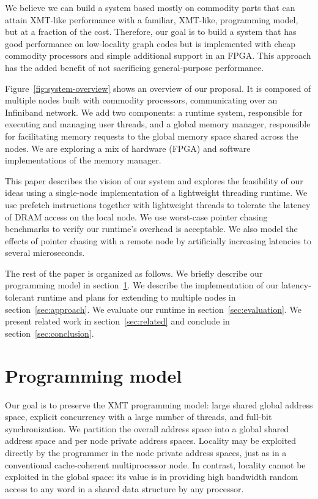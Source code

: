 \documentclass[10pt,nocopyrightspace]{sigplanconf}
\begin{document}
We believe we can build a system based mostly on commodity parts that
can attain XMT-like performance with a familiar, XMT-like,
programming model, but at a fraction of the cost. Therefore, our goal
is to build a system that has good performance on low-locality graph
codes but is implemented with cheap commodity processors and simple
additional support in an FPGA. This approach has the added
benefit of not sacrificing general-purpose performance.

Figure~\ref{fig:system-overview} shows an overview of our proposal. It
is composed of multiple nodes built with commodity processors,
communicating over an Infiniband network. We add two components: a
runtime system, responsible for executing and managing user threads,
and a global memory manager, responsible for facilitating memory
requests to the global memory space shared across the nodes.
We are exploring a mix of hardware (FPGA) and software implementations
of the memory manager.
 
This paper describes the vision of our system and explores the
feasibility of our ideas using a single-node implementation of a
lightweight threading runtime. We use prefetch instructions together
with lightweight threads to tolerate the latency of DRAM access on the
local node. We use worst-case pointer chasing benchmarks to
verify our runtime's overhead is acceptable. We also model the effects
of pointer chasing with a remote node by artificially increasing
latencies to several microseconds.
 
The rest of the paper is organized as follows. We briefly describe our
programming model in section~\ref{sec:model}. We describe the
implementation of our latency-tolerant runtime and plans for extending
to multiple nodes in section~\ref{sec:approach}. We evaluate our
runtime in section~\ref{sec:evaluation}.  We present related work in
section~\ref{sec:related} and conclude in
section~\ref{sec:conclusion}.


\section{Programming model}
\label{sec:model}

Our goal is to preserve the XMT programming model: large shared global
address space, explicit concurrency with a large number of threads,
and full-bit synchronization.  We partition the overall address
space into a global shared address space and per node private address
spaces. Locality may be exploited directly by the programmer in the
node private address spaces, just as in a conventional cache-coherent
multiprocessor node. In contrast, locality cannot be exploited in the
global space: its value is in providing high bandwidth random access
to any word in a shared data structure by any processor.
\end{document}
